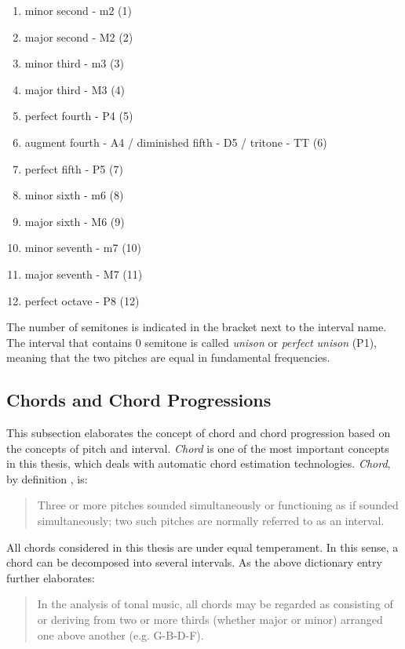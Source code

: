 \begin{enumerate}[label=(\alph*)]
\item minor second - m2 (1)
\item major second - M2 (2)
\item minor third - m3 (3)
\item major third - M3 (4)
\item perfect fourth - P4 (5)
\item augment fourth - A4 / diminished fifth - D5 / tritone - TT (6)
\item perfect fifth - P5 (7)
\item minor sixth - m6 (8)
\item major sixth - M6 (9)
\item minor seventh - m7 (10)
\item major seventh - M7 (11)
\item perfect octave - P8 (12)
\end{enumerate}
The number of semitones is indicated in the bracket next to the interval name. The interval that contains $0$ semitone is called {\it unison} or {\it perfect unison} (P1), meaning that the two pitches are equal in fundamental frequencies. %

\subsection{Chords and Chord Progressions}
This subsection elaborates the concept of chord and chord progression based on the concepts of pitch and interval.
{\it Chord} is one of the most important concepts in this thesis, which deals with automatic chord estimation technologies. {\it Chord}, by definition \cite{randel1999harvard}, is:
\begin{quote}
Three or more pitches sounded simultaneously or functioning as if sounded simultaneously; two such pitches are normally referred to as an interval.
\end{quote}
All chords considered in this thesis are under equal temperament. In this sense, a chord can be decomposed into several intervals. As the above dictionary entry further elaborates:
\begin{quote}
In the analysis of tonal music, all chords may be regarded as consisting of or deriving from two or more thirds (whether major or minor) arranged one above another (e.g. G-B-D-F).
\end{quote}

